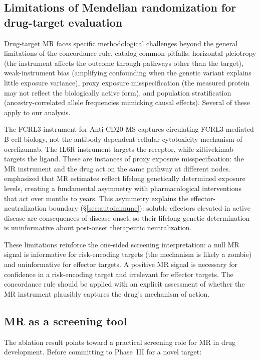 \documentclass[11pt]{article}
\begin{document}
\subsection{Limitations of Mendelian randomization for drug-target evaluation}

Drug-target MR faces specific methodological challenges beyond the general limitations of the concordance rule. \citet{gill2024pitfalls} catalog common pitfalls: horizontal pleiotropy (the instrument affects the outcome through pathways other than the target), weak-instrument bias (amplifying confounding when the genetic variant explains little exposure variance), proxy exposure misspecification (the measured protein may not reflect the biologically active form), and population stratification (ancestry-correlated allele frequencies mimicking causal effects). Several of these apply to our analysis.

The FCRL3 instrument for Anti-CD20-MS captures circulating FCRL3-mediated B-cell biology, not the antibody-dependent cellular cytotoxicity mechanism of ocrelizumab. The IL6R instrument targets the receptor, while ziltivekimab targets the ligand. These are instances of proxy exposure misspecification: the MR instrument and the drug act on the same pathway at different nodes. \citet{daveysmith2014} emphasized that MR estimates reflect lifelong genetically determined exposure levels, creating a fundamental asymmetry with pharmacological interventions that act over months to years. This asymmetry explains the effector-neutralization boundary (\S\ref{sec:autoimmune}): soluble effectors elevated in active disease are consequences of disease onset, so their lifelong genetic determination is uninformative about post-onset therapeutic neutralization.

These limitations reinforce the one-sided screening interpretation: a null MR signal is informative for risk-encoding targets (the mechanism is likely a zombie) and uninformative for effector targets. A positive MR signal is necessary for confidence in a risk-encoding target and irrelevant for effector targets. The concordance rule should be applied with an explicit assessment of whether the MR instrument plausibly captures the drug's mechanism of action.

\subsection{MR as a screening tool}

The ablation result points toward a practical screening role for MR in drug development. Before committing to Phase~III for a novel target:
\end{document}
